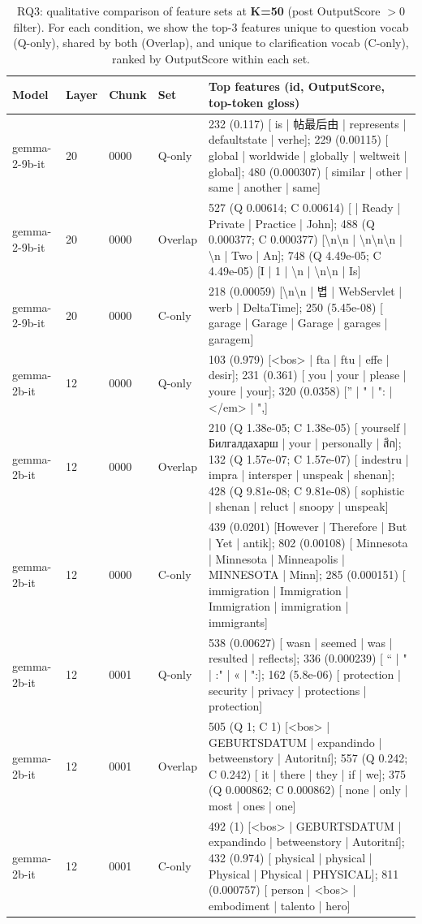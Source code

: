 \begin{table}[t]
\centering
\footnotesize
\begin{tabularx}{\textwidth}{lll l X}
\toprule
Model & Layer & Chunk & Set & Top features (id, OutputScore, top-token gloss) \\
\midrule
gemma-2-9b-it & 20 & 0000 & Q-only & 232 (0.117) [ is | 帖最后由 |  represents |  defaultstate |  verhe]; 229 (0.00115) [ global |  worldwide |  globally |  weltweit | global]; 480 (0.000307) [ similar |  other |  same |  another | same] \\
gemma-2-9b-it & 20 & 0000 & Overlap & 527 (Q 0.00614; C 0.00614) [  |  Ready |  Private |  Practice |  John]; 488 (Q 0.000377; C 0.000377) [\textbackslash{}n\textbackslash{}n | \textbackslash{}n\textbackslash{}n\textbackslash{}n | \textbackslash{}n |  Two |  An]; 748 (Q 4.49e-05; C 4.49e-05) [I | 1 | \textbackslash{}n | \textbackslash{}n\textbackslash{}n | Is] \\
gemma-2-9b-it & 20 & 0000 & C-only & 218 (0.00059) [\textbackslash{}n\textbackslash{}n | 볍 | WebServlet | werb | DeltaTime]; 250 (5.45e-08) [ garage |  Garage | Garage |  garages |  garagem] \\
gemma-2b-it & 12 & 0000 & Q-only & 103 (0.979) [<bos> |  fta |  ftu |  effe |  desir]; 231 (0.361) [ you |  your |  please |  youre | your]; 320 (0.0358) [” | " | ": | </em> | ",] \\
gemma-2b-it & 12 & 0000 & Overlap & 210 (Q 1.38e-05; C 1.38e-05) [ yourself | Билгалдахарш |  your |  personally | สึก]; 132 (Q 1.57e-07; C 1.57e-07) [ indestru |  impra |  intersper |  unspeak |  shenan]; 428 (Q 9.81e-08; C 9.81e-08) [ sophistic |  shenan |  reluct |  snoopy |  unspeak] \\
gemma-2b-it & 12 & 0000 & C-only & 439 (0.0201) [However | Therefore | But | Yet |  antik]; 802 (0.00108) [ Minnesota | Minnesota |  Minneapolis |  MINNESOTA |  Minn]; 285 (0.000151) [ immigration | Immigration |  Immigration | immigration |  immigrants] \\
gemma-2b-it & 12 & 0001 & Q-only & 538 (0.00627) [ wasn |  seemed |  was |  resulted |  reflects]; 336 (0.000239) [ “ |  " | :" |  « | ":]; 162 (5.8e-06) [ protection |  security |  privacy |  protections | protection] \\
gemma-2b-it & 12 & 0001 & Overlap & 505 (Q 1; C 1) [<bos> | GEBURTSDATUM | expandindo |  betweenstory | Autoritní]; 557 (Q 0.242; C 0.242) [ it |  there |  they |  if |  we]; 375 (Q 0.000862; C 0.000862) [ none |  only |  most |  ones |  one] \\
gemma-2b-it & 12 & 0001 & C-only & 492 (1) [<bos> | GEBURTSDATUM | expandindo |  betweenstory | Autoritní]; 432 (0.974) [ physical | physical | Physical |  Physical |  PHYSICAL]; 811 (0.000757) [ person | <bos> |  embodiment |  talento |  hero] \\
\bottomrule
\end{tabularx}
\caption{RQ3: qualitative comparison of feature sets at \textbf{K=50} (post OutputScore $>0$ filter). For each condition, we show the top-3 features unique to question vocab (Q-only), shared by both (Overlap), and unique to clarification vocab (C-only), ranked by OutputScore within each set.}
\label{tab:rq3-overlap-examples}
\end{table}